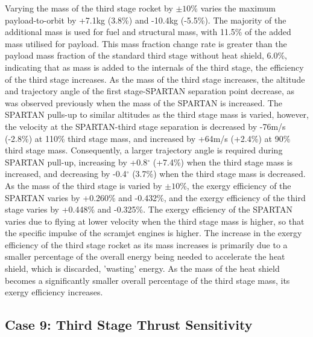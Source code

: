 Varying the mass of the third stage rocket by $\pm10\%$ varies the maximum payload-to-orbit by +7.1kg (3.8\%) and -10.4kg (-5.5\%). 
The majority of the additional mass is used for fuel and structural mass, with 11.5\% of the added mass utilised for payload. This mass fraction change rate is greater than the payload mass fraction of the standard third stage without heat shield, 6.0\%, indicating that as mass is added to the internals of the third stage, the efficiency of the third stage increases.
 As the mass of the third stage increases, the altitude and trajectory angle of the first stage-SPARTAN separation point decrease, as was observed previously when the mass of the SPARTAN is increased. 
 The SPARTAN pulls-up to similar altitudes as the third stage mass is varied, however, the velocity at the SPARTAN-third stage separation is decreased by -76m/s (-2.8\%) at 110\% third stage mass, and increased by +64m/s (+2.4\%)  at 90\% third stage mass. 
 Consequently, a larger trajectory angle is required during SPARTAN pull-up, increasing by +0.8$^\circ$ (+7.4\%) when the third stage mass is increased, and decreasing by -0.4$^\circ$ (3.7\%) when the third stage mass is decreased. 
As the mass of the third stage is varied by $\pm10\%$, the exergy efficiency of the SPARTAN varies by +0.260\% and -0.432\%, and the exergy efficiency of the third stage varies by +0.448\% and -0.325\%. The exergy efficiency of the SPARTAN varies due to flying at lower velocity when the third stage mass is higher, so that the specific impulse of the scramjet engines is higher. 
The increase in the exergy efficiency of the third stage rocket as its mass increases is primarily due to a smaller percentage of the overall energy being needed to accelerate the heat shield, which is discarded, 'wasting' energy. As the mass of the heat shield becomes a significantly smaller overall percentage of the third stage mass, its exergy efficiency increases. 



\subsection{Case 9: Third Stage Thrust Sensitivity}

